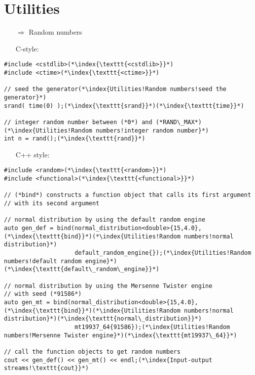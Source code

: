 \documentclass[10pt]{article}
\begin{document}
\section{Utilities}
\small
\begin{enumerate}
\item[$\Rightarrow$] Random numbers
\end{enumerate}
\begin{enumerate}
\item[] C-style:
\end{enumerate}
\begin{lstlisting}
#include <cstdlib>(*\index{\texttt{<cstdlib>}}*)
#include <ctime>(*\index{\texttt{<ctime>}}*)

// seed the generator(*\index{Utilities!Random numbers!seed the generator}*)
srand( time(0) );(*\index{\texttt{srand}}*)(*\index{\texttt{time}}*)

// integer random number between (*0*) and (*RAND\_MAX*)(*\index{Utilities!Random numbers!integer random number}*)
int n = rand();(*\index{\texttt{rand}}*)
\end{lstlisting}
\begin{enumerate}
\item[] C++ style:
\end{enumerate}
\begin{lstlisting}
#include <random>(*\index{\texttt{<random>}}*)
#include <functional>(*\index{\texttt{<functional>}}*)

// (*bind*) constructs a function object that calls its first argument
// with its second argument

// normal distribution by using the default random engine
auto gen_def = bind(normal_distribution<double>{15,4.0},(*\index{\texttt{bind}}*)(*\index{Utilities!Random numbers!normal distribution}*)
                    default_random_engine{});(*\index{Utilities!Random numbers!default random engine}*)(*\index{\texttt{default\_random\_engine}}*)
                    
// normal distribution by using the Mersenne Twister engine
// with seed (*91586*)                  
auto gen_mt = bind(normal_distribution<double>{15,4.0},(*\index{\texttt{bind}}*)(*\index{Utilities!Random numbers!normal distribution}*)(*\index{\texttt{normal\_distribution}}*)
                    mt19937_64{91586});(*\index{Utilities!Random numbers!Mersenne Twister engine}*)(*\index{\texttt{mt19937\_64}}*)

// call the function objects to get random numbers
cout << gen_def() << gen_mt() << endl;(*\index{Input-output streams!\texttt{cout}}*)
\end{lstlisting}
\end{document}
